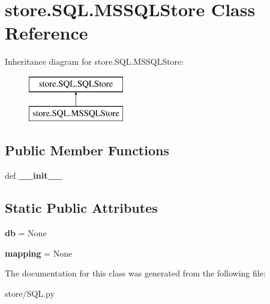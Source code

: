 \hypertarget{classstore_1_1_s_q_l_1_1_m_s_s_q_l_store}{\section{store.\-S\-Q\-L.\-M\-S\-S\-Q\-L\-Store Class Reference}
\label{classstore_1_1_s_q_l_1_1_m_s_s_q_l_store}
}
Inheritance diagram for store.\-S\-Q\-L.\-M\-S\-S\-Q\-L\-Store\-:\begin{figure}[H]
\begin{center}
\leavevmode
\includegraphics[height=2.000000cm]{classstore_1_1_s_q_l_1_1_m_s_s_q_l_store}
\end{center}
\end{figure}
\subsection*{Public Member Functions}
\begin{DoxyCompactItemize}
\item 
\hypertarget{classstore_1_1_s_q_l_1_1_m_s_s_q_l_store_a7f83db493f5d67372484e46bc18f67e7}{def {\bfseries \-\_\-\-\_\-init\-\_\-\-\_\-}}\label{classstore_1_1_s_q_l_1_1_m_s_s_q_l_store_a7f83db493f5d67372484e46bc18f67e7}

\end{DoxyCompactItemize}
\subsection*{Static Public Attributes}
\begin{DoxyCompactItemize}
\item 
\hypertarget{classstore_1_1_s_q_l_1_1_m_s_s_q_l_store_a8f15cb345b818b5d16a594420b654d20}{{\bfseries db} = None}\label{classstore_1_1_s_q_l_1_1_m_s_s_q_l_store_a8f15cb345b818b5d16a594420b654d20}

\item 
\hypertarget{classstore_1_1_s_q_l_1_1_m_s_s_q_l_store_a9a6ae01b6850527bc2683d0f6baef0f4}{{\bfseries mapping} = None}\label{classstore_1_1_s_q_l_1_1_m_s_s_q_l_store_a9a6ae01b6850527bc2683d0f6baef0f4}

\end{DoxyCompactItemize}


The documentation for this class was generated from the following file\-:\begin{DoxyCompactItemize}
\item 
store/S\-Q\-L.\-py\end{DoxyCompactItemize}
